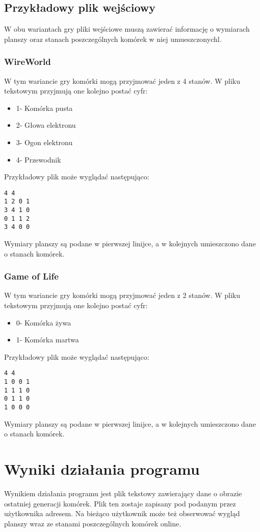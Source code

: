 \documentclass[10pt, oneside]{article}
\begin{document}
\subsection{Przykładowy plik wejściowy}
W obu wariantach gry pliki wejściowe muszą zawierać informację o wymiarach planszy oraz stanach poszczególnych komórek w niej umueszczonychl.
\subsubsection{WireWorld}
W tym wariancie gry komórki mogą przyjmować jeden z 4 stanów. W pliku tekstowym przyjmują one kolejno postać cyfr:
\begin{itemize}
\item 1- Komórka pusta
\item 2- Głowa elektronu
\item 3- Ogon elektronu
\item 4- Przewodnik
\end{itemize}
Przykładowy plik może wyglądać następująco:
\begin {verbatim}
4 4
1 2 0 1
3 4 1 0
0 1 1 2
3 4 0 0 
\end{verbatim}
Wymiary planszy są podane w pierwszej linijce, a w kolejnych umieszczono dane o stanach komórek.

\subsubsection{Game of Life}
W tym wariancie gry komórki mogą przyjmować jeden z 2 stanów. W pliku tekstowym przyjmują one kolejno postać cyfr:
\begin{itemize}
\item 0- Komórka  żywa
\item 1- Komórka martwa
\end{itemize}
Przykładowy plik może wyglądać następująco:
\begin {verbatim}
4 4
1 0 0 1
1 1 1 0
0 1 1 0
1 0 0 0 
\end{verbatim}
Wymiary planszy są podane w pierwszej linijce, a w kolejnych umieszczono dane o stanach komórek.






\section{Wyniki działania programu}
Wynikiem działania programu jest plik tekstowy zawierający dane o obrazie ostatniej generacji komórek. Plik ten zostaje zapisany pod podanym przez użytkownika adresem.  Na bieżąco użytkownik może też obserwować wygląd planszy wraz ze stanami poszczególnych komórek online.
\end{document}
